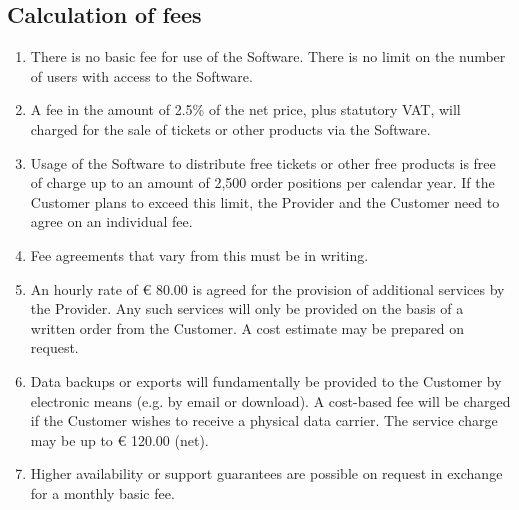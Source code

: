 \documentclass{terms}
\begin{document}
\subsection{Calculation of fees}
\label{entgelt}
\begin{enumerate}
\item There is no basic fee for use of the Software. There is no limit on the number of users with access to the Software.
\item A fee in the amount of 2.5\% of the net price, plus statutory VAT, will charged for the sale of tickets or other products via the Software.
\item Usage of the Software to distribute free tickets or other free products is free of charge up to an amount of 2,500 order positions per calendar year. If the Customer plans to exceed this limit, the Provider and the Customer need to agree on an individual fee.
\item Fee agreements that vary from this must be in writing.
\item An hourly rate of € 80.00 is agreed for the provision of additional services by the Provider. Any such services will only be provided on the basis of a written order from the Customer. A cost estimate may be prepared on request.
\item Data backups or exports will fundamentally be provided to the Customer by electronic means (e.g. by email or download). A cost-based fee will be charged if the Customer wishes to receive a physical data carrier. The service charge may be up to € 120.00 (net).
\item Higher availability or support guarantees are possible on request in exchange for a monthly basic fee.
\end{enumerate}
\end{document}
